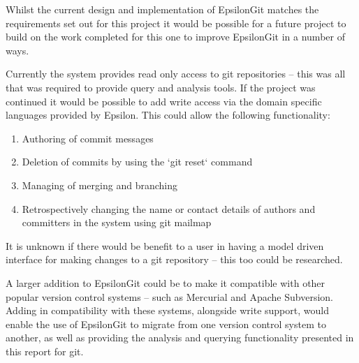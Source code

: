 \documentclass[runningheads,a4paper]{llncs}
\begin{document}
Whilst the current design and implementation of EpsilonGit matches the requirements set out for this project it would be possible for a future project to build on the work completed for this one to improve EpsilonGit in a number of ways. 

Currently the system provides read only access to git repositories -- this was all that was required to provide query and analysis tools. If the project was continued it would be possible to add write access via the domain specific languages provided by Epsilon. This could allow the following functionality:

\begin{enumerate}
	\item Authoring of commit messages
	\item Deletion of commits by using the `git reset` command \cite{gitreset}
	\item Managing of merging and branching
	\item Retrospectively changing the name or contact details of authors and committers in the system using git mailmap \cite{gitmailmap}
\end{enumerate} 

It is unknown if there would be benefit to a user in having a model driven interface for making changes to a git repository -- this too could be researched. 

A larger addition to EpsilonGit could be to make it compatible with other popular version control systems -- such as Mercurial and Apache Subversion. Adding in compatibility with these systems, alongside write support, would enable the use of EpsilonGit to migrate from one version control system to another, as well as providing the analysis and querying functionality presented in this report for git.



\end{document}
